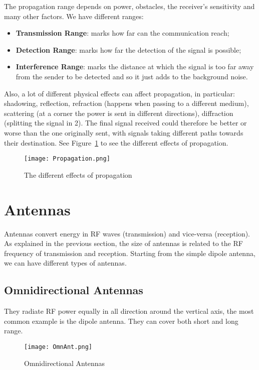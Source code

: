 The propagation range depends on power, obstacles, the receiver's 
sensitivity and many other factors. We have different ranges:
\begin{itemize}
\item \textbf{Transmission Range}: marks how far can the communication 
  reach;
\item \textbf{Detection Range}: marks how far the detection of the signal 
  is possible;
\item \textbf{Interference Range}: marks the distance at which the signal 
  is too far away from the sender to be detected and so it just adds to the 
  background noise.
\end{itemize}
Also, a lot of different physical effects can affect propagation, in 
particular: shadowing, reflection, refraction (happens when passing to a 
different medium), scattering (at a corner the power is sent in different 
directions), diffraction (splitting the signal in 2).
The final signal received could therefore be better or worse than the 
one originally sent, with signals taking different paths towards their 
destination. See Figure~\ref{fig:ewn:Propagation} to see the different effects 
of propagation.

\begin{figure}[h]
  \centering
  \texttt{[image: Propagation.png]}
  \caption{The different effects of propagation}
  \label{fig:ewn:Propagation}
\end{figure}

\section{Antennas}
Antennas convert energy in RF waves (transmission) and vice-versa 
(reception). As explained in the previous section, the size of antennas is 
related to the RF frequency of transmission and reception.
Starting from the simple dipole antenna, we can have different types of 
antennas.

\subsection{Omnidirectional Antennas} They radiate RF power equally 
in all direction around the vertical axis, the most common example is the dipole 
antenna. They can cover both short and long range.
\begin{figure}[t]
  \centering
  \texttt{[image: OmnAnt.png]}
  \caption{Omnidirectional Antennas}				
  \label{fig:ewn:OmnAnt}
\end{figure}

